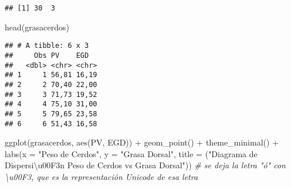 \documentclass[
]{article}
\newenvironment{Shaded}{\begin{snugshade}}{\end{snugshade}}
\newcommand{\AttributeTok}[1]{\textcolor[rgb]{0.77,0.63,0.00}{#1}}
\newcommand{\CommentTok}[1]{\textcolor[rgb]{0.56,0.35,0.01}{\textit{#1}}}
\newcommand{\FunctionTok}[1]{\textcolor[rgb]{0.00,0.00,0.00}{#1}}
\newcommand{\NormalTok}[1]{#1}
\newcommand{\OtherTok}[1]{\textcolor[rgb]{0.56,0.35,0.01}{#1}}
\newcommand{\SpecialCharTok}[1]{\textcolor[rgb]{0.00,0.00,0.00}{#1}}
\newcommand{\StringTok}[1]{\textcolor[rgb]{0.31,0.60,0.02}{#1}}
\begin{document}
\begin{verbatim}
## [1] 30  3
\end{verbatim}

\begin{Shaded}
\begin{Highlighting}[]
\FunctionTok{head}\NormalTok{(grasacerdos)}
\end{Highlighting}
\end{Shaded}

\begin{verbatim}
## # A tibble: 6 x 3
##     Obs PV    EGD  
##   <dbl> <chr> <chr>
## 1     1 56,81 16,19
## 2     2 70,40 22,00
## 3     3 71,73 19,52
## 4     4 75,10 31,00
## 5     5 79,65 23,58
## 6     6 51,43 16,58
\end{verbatim}

\begin{Shaded}
\end{Shaded}

\begin{Shaded}
\begin{Highlighting}[]
\FunctionTok{ggplot}\NormalTok{(grasacerdos, }\FunctionTok{aes}\NormalTok{(PV, EGD)) }\SpecialCharTok{+}
  \FunctionTok{geom\_point}\NormalTok{() }\SpecialCharTok{+}
  \FunctionTok{theme\_minimal}\NormalTok{() }\SpecialCharTok{+}
  \FunctionTok{labs}\NormalTok{(}\AttributeTok{x =} \StringTok{"Peso de Cerdos"}\NormalTok{, }\AttributeTok{y =} \StringTok{"Grasa Dorsal"}\NormalTok{,}
       \AttributeTok{title =}\NormalTok{ (}\StringTok{"Diagrama de Dispersi\textbackslash{}u00F3n Peso de Cerdos vs Grasa Dorsal"}\NormalTok{)) }\CommentTok{\# se deja la letra "ó" con \textbackslash{}u00F3, que                                                                             es la representación Unicode de esa letra}
\end{Highlighting}
\end{Shaded}
\end{document}
